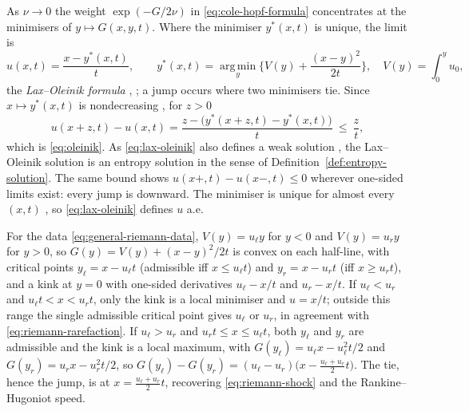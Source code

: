 \begin{remark}
\label{rem:lax-oleinik}
As $\nu\to0$ the weight $\exp(-G/2\nu)$ in \eqref{eq:cole-hopf-formula}
concentrates at the minimisers of $y\mapsto G(x,y,t)$. Where the minimiser
$y^*(x,t)$ is unique, the limit is
\begin{equation}
  \label{eq:lax-oleinik}
  u(x,t)=\frac{x-y^*(x,t)}{t},\qquad
  y^*(x,t)=\operatorname*{arg\,min}_y\Big\{V(y)+\frac{(x-y)^2}{2t}\Big\},
  \quad V(y)=\int_0^y u_0 ,
\end{equation}
the \emph{Lax--Oleinik formula} \cite{lax1957,oleinik1957},
\cite[\S3.4.2]{evans2010}; a jump occurs where two minimisers tie. Since
$x\mapsto y^*(x,t)$ is nondecreasing \cite[\S3.4.2]{evans2010}, for $z>0$
\begin{equation*}
  u(x+z,t)-u(x,t)=\frac{z-\big(y^*(x+z,t)-y^*(x,t)\big)}{t}\ \le\ \frac zt,
\end{equation*}
which is \eqref{eq:oleinik}. As \eqref{eq:lax-oleinik} also defines a weak
solution \cite[\S3.4.2]{evans2010}, the Lax--Oleinik solution is an entropy
solution in the sense of Definition~\ref{def:entropy-solution}. The same bound
shows $u(x+,t)-u(x-,t)\le0$ wherever one-sided limits exist: every jump is
downward. The minimiser is unique for almost every $(x,t)$
\cite[\S3.4.2]{evans2010}, so \eqref{eq:lax-oleinik} defines $u$ a.e.
\end{remark}

\begin{remark}
\label{rem:riemann-lax-oleinik}
For the data \eqref{eq:general-riemann-data}, $V(y)=u_\ell y$ for $y<0$ and
$V(y)=u_r y$ for $y>0$, so $G(y)=V(y)+(x-y)^2/2t$ is convex on each half-line, with
critical points $y_\ell=x-u_\ell t$ (admissible iff $x\le u_\ell t$) and
$y_r=x-u_rt$ (iff $x\ge u_rt$), and a kink at $y=0$ with one-sided derivatives
$u_\ell-x/t$ and $u_r-x/t$. If $u_\ell<u_r$ and $u_\ell t<x<u_rt$, only the kink
is a local minimiser and $u=x/t$; outside this range the single admissible
critical point gives $u_\ell$ or $u_r$, in agreement with
\eqref{eq:riemann-rarefaction}.
If $u_\ell>u_r$ and $u_rt\le x\le u_\ell t$, both $y_\ell$ and $y_r$ are admissible
and the kink is a local maximum, with
$G(y_\ell)=u_\ell x-u_\ell^2t/2$ and $G(y_r)=u_rx-u_r^2t/2$, so
$G(y_\ell)-G(y_r)=(u_\ell-u_r)\big(x-\tfrac{u_\ell+u_r}2t\big)$. The tie, hence the
jump, is at $x=\tfrac{u_\ell+u_r}2t$, recovering \eqref{eq:riemann-shock} and the
Rankine--Hugoniot speed.
\end{remark}

